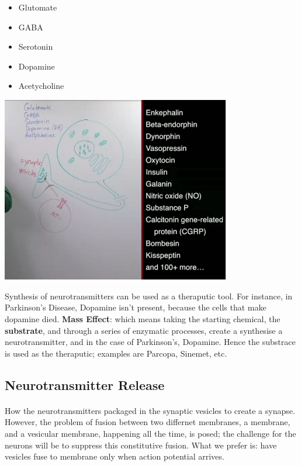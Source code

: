 \documentclass[12pt, a4paper]{article}
\begin{document}
\begin{itemize}
    \item Glutomate
    \item GABA
    \item Serotonin
    \item Dopamine
    \item Acetycholine
\end{itemize}

{
    \centering
    \includegraphics[width=10cm]{Neurtransmitters_SynapticVesicles.png}

}

Synthesis of neurotransmitters can be used as a theraputic tool. For instance,
in Parkinson's Disease, Dopamine isn't present, because the cells that make dopamine died.
\textbf{Mass Effect}: which means taking the starting chemical, the \textbf{substrate},
and through a series of enzymatic processes, create a synthesise a neurotransmitter,
and in the case of Parkinson's, Dopamine. Hence the substrace is used as the theraputic; examples are
Parcopa, Sinemet, etc.

\subsection{Neurotransmitter Release}
\paragraph*{}
How the neurotransmitters packaged in the synaptic vesicles to create a synapse.
However, the problem of fusion between two differnet membranes, a membrane, and a vesicular membrane,
happening all the time, is posed; the challenge for the neurons will be to suppress this
constitutive fusion. What we prefer is: have vesicles fuse to membrane only when action potential arrives.
\end{document}
